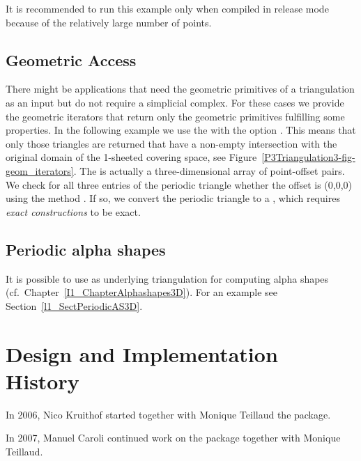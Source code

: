 It is recommended to run this example only when compiled in release
mode because of the relatively large number of points. 


\subsection{Geometric Access}

There might be applications that need the geometric primitives of a
triangulation as an input but do not require a simplicial complex. For
these cases we provide the geometric iterators that return only the
geometric primitives fulfilling some properties. In the following
example we use the  with the option
. This means that only those triangles are
returned that have a non-empty intersection with the original domain
of the 1-sheeted covering space, see
Figure~\ref{P3Triangulation3-fig-geom_iterators}.
The  is actually a three-dimensional array of
point-offset pairs. We check for all three entries of the periodic
triangle whether the offset  is (0,0,0) using the
method . If so, we convert the periodic triangle to a
, which requires \emph{exact constructions} to be
exact.  


\subsection{Periodic alpha shapes}

It is possible to use 
as underlying triangulation for computing alpha shapes (cf.\
Chapter~\ref{I1_ChapterAlphashapes3D}). For an example see
Section~\ref{l1_SectPeriodicAS3D}.

\section{Design and Implementation History}

In 2006, Nico Kruithof started together with Monique Teillaud the
 package.

In 2007, Manuel Caroli continued work on the
\ccc{Periodic_3_triangulation_3} package together with Monique
Teillaud.
